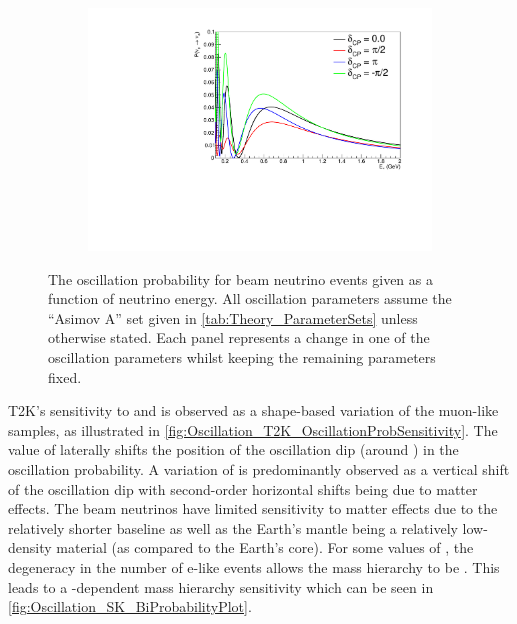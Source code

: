 \begin{figure}[h]
\begin{subfigure}[t]{0.5\textwidth}
    \includegraphics[width=\textwidth, trim={0mm 0mm 0mm 0mm}, clip,page=1]{Figures/Oscillation/T2K_NuMu_x_NuE_DCPSens.pdf}
    \subcaption{\dcp}
  \end{subfigure}
  \caption{The oscillation probability for beam neutrino events given as a function of neutrino energy. All oscillation parameters assume the ``Asimov A'' set given in \autoref{tab:Theory_ParameterSets} unless otherwise stated. Each panel represents a change in one of the oscillation parameters whilst keeping the remaining parameters fixed.}
  \label{fig:Oscillation_T2K_OscillationProbSensitivity}
\end{figure}

T2K's sensitivity to \sinsqatm and \delmsqatm is observed as a shape-based variation of the muon-like samples, as illustrated in \autoref{fig:Oscillation_T2K_OscillationProbSensitivity}. The value of  laterally shifts the position of the oscillation dip (around ) in the  oscillation probability. A variation of \sinsqatm is predominantly observed as a vertical shift of the oscillation dip with second-order horizontal shifts being due to matter effects. The beam neutrinos have limited sensitivity to matter effects due to the relatively shorter baseline as well as the Earth's mantle being a relatively low-density material (as compared to the Earth's core). For some values of \dcp, the degeneracy in the number of e-like events allows the mass hierarchy to be  . This leads to a \dcp-dependent mass hierarchy sensitivity which can be seen in \autoref{fig:Oscillation_SK_BiProbabilityPlot}.

